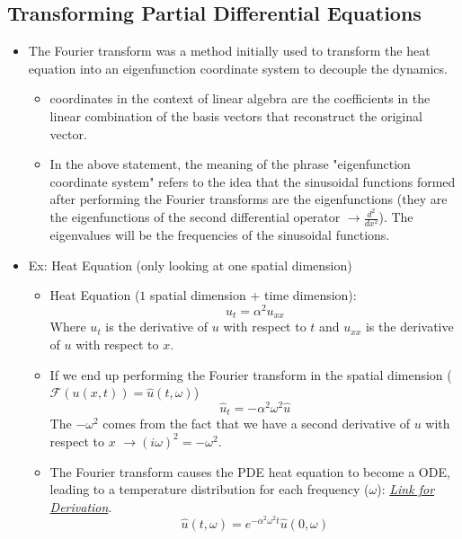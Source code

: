 \documentclass[11.5pt,a4paper]{article}
\begin{document}
\subsection*{Transforming Partial Differential Equations}

\begin{itemize}
    \item The Fourier transform was a method initially used to transform the heat equation into an eigenfunction coordinate system to decouple the dynamics.
    \begin{itemize}
        \item coordinates in the context of linear algebra are the coefficients in the linear combination of the basis vectors that reconstruct the original vector.
        \item In the above statement, the meaning of the phrase "eigenfunction coordinate system" refers to the idea that the sinusoidal functions formed after performing the Fourier transforms are the eigenfunctions (they are the eigenfunctions of the second differential operator $\rightarrow \frac{d^2}{dx^2}$). The eigenvalues will be the frequencies of the sinusoidal functions.
    \end{itemize}
    \item Ex: Heat Equation (only looking at one spatial dimension)
    \begin{itemize}
        \item Heat Equation ($1$ spatial dimension + time dimension):
        \begin{equation*}
            u_t = \alpha^2u_{xx}
        \end{equation*}
        Where $u_t$ is the derivative of $u$ with respect to $t$ and $u_{xx}$ is the derivative of $u$ with respect to $x$.
        \item If we end up performing the Fourier transform in the spatial dimension ($\mathcal{F}(u(x,t)) = \hat u(t, \omega)$)
        \begin{equation*}
            \hat{u}_t = -\alpha^2\omega^2\hat{u}
        \end{equation*}
        The $-\omega^2$ comes from the fact that we have a second derivative of $u$ with respect to $x$ $\rightarrow (i\omega)^2 = -\omega^2$.
        \item The Fourier transform causes the PDE heat equation to become a ODE, leading to a temperature distribution for each frequency ($\omega$): \href{https://chatgpt.com/c/681fa993-0a2c-800a-9edd-88c848b307f9}{\textit{Link for Derivation}}. 
        \begin{equation*}
            \hat{u}(t, \omega) = e^{-\alpha^2\omega^2t}\hat{u}(0,\omega)
        \end{equation*}


\end{itemize}
\end{itemize}
\end{document}
